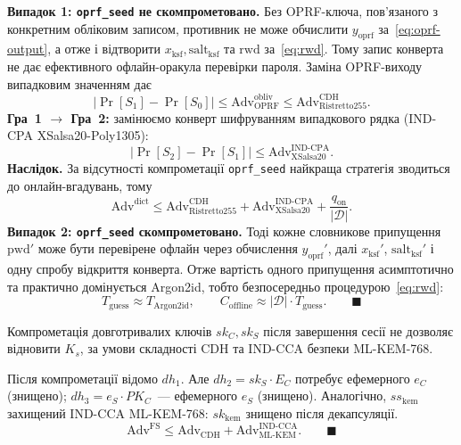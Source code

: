 \documentclass{llncs}
\begin{document}
\begin{sketchproof}
\textbf{Випадок 1: \textnormal{\texttt{oprf\_seed}} не скомпрометовано.} Без
OPRF-ключа, пов'язаного з конкретним обліковим записом, противник не може обчислити
$y_{\mathrm{oprf}}$ за~\eqref{eq:oprf-output}, а отже і відтворити
$x_{\mathrm{ksf}}, \mathrm{salt}_{\mathrm{ksf}}$ та
$\mathrm{rwd}$ за~\eqref{eq:rwd}. Тому запис конверта не дає ефективного офлайн-оракула
перевірки пароля. Заміна OPRF-виходу випадковим значенням дає
\[
  |\Pr[S_1] - \Pr[S_0]| \leq
  \mathrm{Adv}_{\mathrm{OPRF}}^{\mathrm{obliv}}
  \leq \mathrm{Adv}_{\mathrm{Ristretto255}}^{\mathrm{CDH}}.
\]
\textbf{Гра~1 $\to$ Гра~2:} замінюємо конверт шифруванням
випадкового рядка (IND-CPA XSalsa20-Poly1305):
\[
  |\Pr[S_2] - \Pr[S_1]| \leq
  \mathrm{Adv}_{\mathrm{XSalsa20}}^{\mathrm{IND\text{-}CPA}}.
\]
\textbf{Наслідок.} За відсутності компрометації
\texttt{oprf\_seed} найкраща стратегія зводиться до онлайн-вгадувань,
тому
\[
  \mathrm{Adv}^{\mathrm{dict}} \leq
  \mathrm{Adv}_{\mathrm{Ristretto255}}^{\mathrm{CDH}} +
  \mathrm{Adv}_{\mathrm{XSalsa20}}^{\mathrm{IND\text{-}CPA}} +
  \frac{q_{\mathrm{on}}}{|\mathcal{D}|}.
\]
\textbf{Випадок 2: \textnormal{\texttt{oprf\_seed}} скомпрометовано.} Тоді кожне
словникове припущення $\mathrm{pwd}'$ може бути перевірене офлайн через
обчислення $y_{\mathrm{oprf}}'$, далі $x_{\mathrm{ksf}}'$,
$\mathrm{salt}_{\mathrm{ksf}}'$ і одну спробу відкриття конверта. Отже
вартість одного припущення асимптотично та практично домінується
Argon2id, тобто безпосередньо процедурою~\eqref{eq:rwd}:
\[
  T_{\mathrm{guess}} \approx T_{\mathrm{Argon2id}},\qquad
  C_{\mathrm{offline}} \approx |\mathcal{D}| \cdot T_{\mathrm{guess}}.
  \qquad \blacksquare
\]
\end{sketchproof}

\begin{utheorem}
Компрометація довготривалих ключів $sk_C, sk_S$ після завершення
сесії не дозволяє відновити $K_s$, за умови складності CDH та
IND-CCA безпеки ML-KEM-768.
\end{utheorem}

\begin{sketchproof}
Після компрометації відомо $dh_1$. Але $dh_2 = sk_S \cdot E_C$
потребує ефемерного $e_C$ (знищено); $dh_3 = e_S \cdot PK_C$~---
ефемерного $e_S$ (знищено). Аналогічно, $ss_{\mathrm{kem}}$
захищений IND-CCA ML-KEM-768: $sk_{\mathrm{kem}}$ знищено після
декапсуляції.
\[
  \mathrm{Adv}^{\mathrm{FS}} \leq
  \mathrm{Adv}_{\mathrm{CDH}} +
  \mathrm{Adv}_{\mathrm{ML\text{-}KEM}}^{\mathrm{IND\text{-}CCA}}.
  \qquad \blacksquare
\]
\end{sketchproof}
\end{document}
